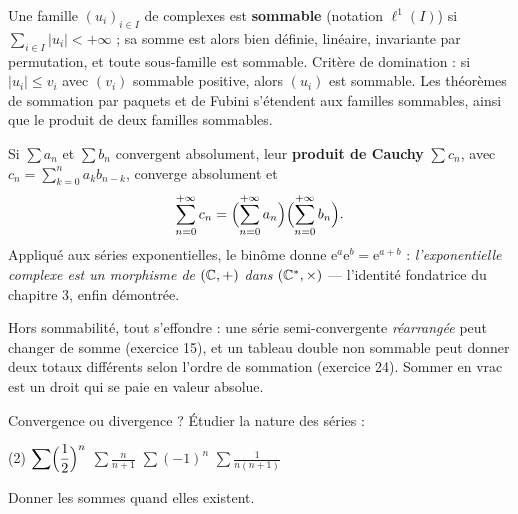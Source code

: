 
\begin{theoreme}
Une famille $(u_i)_{i\in I}$ de complexes est \textbf{sommable}
(notation $\ell^{1}(I)$) si $\sum_{i\in I}|u_i|<+\infty$ ; sa somme est
alors bien définie, linéaire, invariante par permutation, et toute
sous-famille est sommable. Critère de domination : si
$|u_i|\leqslant v_i$ avec $(v_i)$ sommable positive, alors
$(u_i)$ est sommable. Les théorèmes de sommation par paquets et de
Fubini s'étendent aux familles sommables, ainsi que le produit de deux
familles sommables.
\end{theoreme}

\begin{theoreme}
Si $\sum a_n$ et $\sum b_n$ convergent absolument, leur \textbf{produit
de Cauchy} $\sum c_n$, avec $c_n=\sum_{k=0}^{n}a_kb_{n-k}$, converge
absolument et
\[
\sum_{n=0}^{+\infty}c_n
=\Bigl(\sum_{n=0}^{+\infty}a_n\Bigr)\Bigl(\sum_{n=0}^{+\infty}b_n\Bigr) .
\]
Appliqué aux séries exponentielles, le binôme donne
$\mathrm{e}^{a}\mathrm{e}^{b}=\mathrm{e}^{a+b}$ : \emph{l'exponentielle
complexe est un morphisme de $(\mathbb{C},+)$ dans $(\mathbb{C}^{*},\times)$} —
l'identité fondatrice du chapitre 3, enfin démontrée.
\end{theoreme}

\begin{attention}
Hors sommabilité, tout s'effondre : une série semi-convergente
\emph{réarrangée} peut changer de somme (exercice 15), et un tableau
double non sommable peut donner deux totaux différents selon l'ordre de
sommation (exercice 24). Sommer en vrac est un droit qui se paie en
valeur absolue.
\end{attention}

\exercices
{}

\begin{exercice}[1]{Convergence ou divergence ?}
Étudier la nature des séries :
\begin{tasks}(2)
  \task $\displaystyle\sum\Bigl(\frac12\Bigr)^{n}$
  \task $\displaystyle\sum\frac{n}{n+1}$
  \task $\displaystyle\sum(-1)^{n}$
  \task $\displaystyle\sum\frac{1}{n(n+1)}$
\end{tasks}
Donner les sommes quand elles existent.
\end{exercice}


